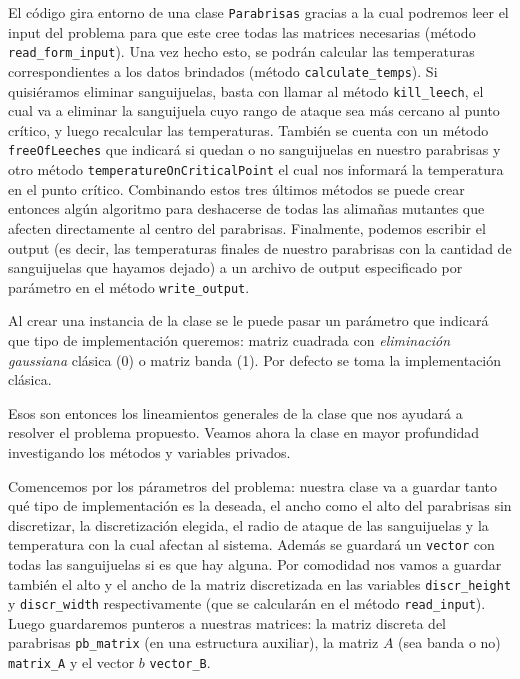El código gira entorno de una clase \texttt{Parabrisas} gracias a la cual podremos leer el input del problema para que este cree todas las matrices necesarias (método \texttt{read\_form\_input}). Una vez hecho esto, se podrán calcular las temperaturas correspondientes a los datos brindados (método \texttt{calculate\_temps}). Si quisiéramos eliminar sanguijuelas, basta con llamar al método \texttt{kill\_leech}, el cual va a eliminar la sanguijuela cuyo rango de ataque sea más cercano al punto crítico, y luego recalcular las temperaturas. También se cuenta con un método \texttt{freeOfLeeches} que indicará si quedan o no sanguijuelas en nuestro parabrisas y otro método \texttt{temperatureOnCriticalPoint} el cual nos informará la temperatura en el punto crítico. Combinando estos tres últimos métodos se puede crear entonces algún algoritmo para deshacerse de todas las alimañas mutantes que afecten directamente al centro del parabrisas. Finalmente, podemos escribir el output (es decir, las temperaturas finales de nuestro parabrisas con la cantidad de sanguijuelas que hayamos dejado) a un archivo de output especificado por parámetro en el método \texttt{write\_output}.

Al crear una instancia de la clase se le puede pasar un parámetro que indicará que tipo de implementación queremos: matriz cuadrada con \textit{eliminación gaussiana} clásica (0) o matriz banda (1). Por defecto se toma la implementación clásica.

\vspace{\baselineskip}

Esos son entonces los lineamientos generales de la clase que nos ayudará a resolver el problema propuesto. Veamos ahora la clase en mayor profundidad investigando los métodos y variables privados.

Comencemos por los párametros del problema: nuestra clase va a guardar tanto qué tipo de implementación es la deseada, el ancho como el alto del parabrisas sin discretizar, la discretización elegida, el radio de ataque de las sanguijuelas y la temperatura con la cual afectan al sistema. Además se guardará un \texttt{vector} con todas las sanguijuelas si es que hay alguna. Por comodidad nos vamos a guardar también el alto y el ancho de la matriz discretizada en las variables \texttt{discr\_height} y \texttt{discr\_width} respectivamente (que se calcularán en el método \texttt{read\_input}). Luego guardaremos punteros a nuestras matrices: la matriz discreta del parabrisas \texttt{pb\_matrix} (en una estructura auxiliar), la matriz $A$ (sea banda o no) \texttt{matrix\_A} y el vector $b$ \texttt{vector\_B}.

